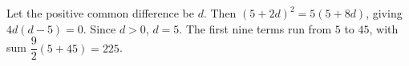 Let the positive common difference be $d$. Then $(5+2d)^2=5(5+8d)$, giving $4d(d-5)=0$. Since $d>0$, $d=5$. The first nine terms run from $5$ to $45$, with sum $\dfrac{9}{2}(5+45)=\boxed{225}$.
